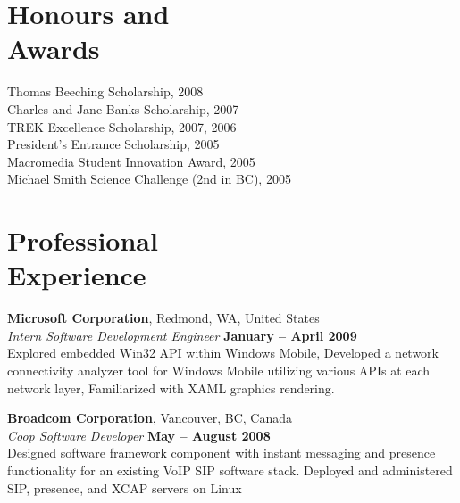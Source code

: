 \documentclass[margin,line]{resume}
\begin{document}
\begin{resume}
    \section{\mysidestyle Honours and\\Awards} 

    Thomas Beeching Scholarship, 2008
        \vspace{1mm}\\%
    Charles and Jane Banks Scholarship, 2007
        \vspace{1mm}\\%
    TREK Excellence Scholarship, 2007, 2006
        \vspace{1mm}\\%
    President's Entrance Scholarship, 2005
        \vspace{1mm}\\%
    Macromedia Student Innovation Award, 2005
        \vspace{1mm}\\%
    Michael Smith Science Challenge (2nd in BC), 2005

    \section{\mysidestyle Professional\\Experience}

    \textbf{Microsoft Corporation}, Redmond, WA, United States \vspace{2mm}\\\vspace{1mm}%
    \textsl{Intern Software Development Engineer} \hfill \textbf{January -- April 2009}\\
    Explored embedded Win32 API within Windows Mobile,
    Developed a network connectivity analyzer tool for Windows Mobile utilizing various APIs at each network layer,
    Familiarized with XAML graphics rendering.

    \textbf{Broadcom Corporation}, Vancouver, BC, Canada \vspace{2mm}\\\vspace{1mm}%
    \textsl{Coop Software Developer} \hfill \textbf{May -- August 2008}\\
    Designed software framework component with instant messaging and presence functionality for an existing VoIP SIP software stack.
    Deployed and administered SIP, presence, and XCAP servers on Linux


\end{resume}
\end{document}
